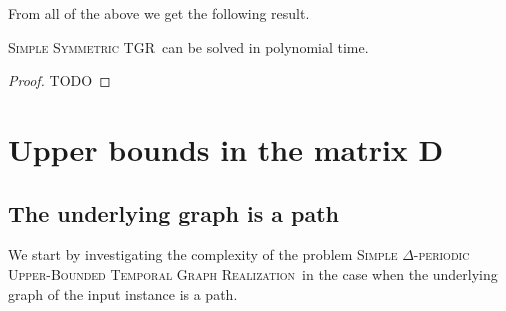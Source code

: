 \documentclass[a4paper,UKenglish,cleveref, autoref, thm-restate]{lipics-v2021}
\newcommand{\deltaSymExact}{\textsc{Simple Symmetric TGR}}
\newcommand{\DeltaUpperBoundLong}{\textsc{Simple $\Delta$-periodic Upper-Bounded Temporal Graph Realization}}
\begin{document}
From all of the above we get the following result.
\begin{theorem}
	\deltaSymExact\ can be solved in polynomial time.
\end{theorem}
\begin{proof}
	TODO
\end{proof}

\section{Upper bounds in the matrix D}

\subsection{The underlying graph is a path}
We start by investigating the complexity of the problem \DeltaUpperBoundLong\ in the case when the underlying graph of the input instance is a path.
\end{document}
